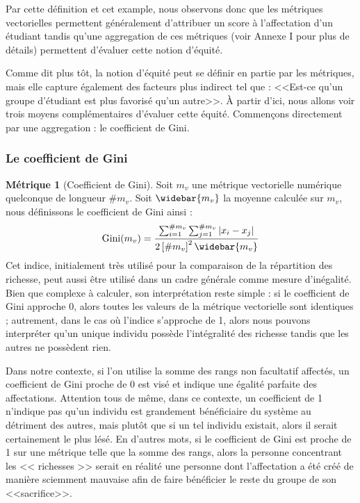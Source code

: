 \documentclass{rapport}
\theoremstyle{definition}
\theoremstyle{remark}
\theoremstyle{plain}
\theoremstyle{definition}
\newtheorem*{metric}{Métrique}
\theoremstyle{remark}
\begin{document}
Par cette définition et cet example, nous observons donc que les métriques vectorielles permettent généralement d'attribuer un score à l'affectation d'un étudiant tandis qu'une aggregation de ces métriques (voir Annexe I pour plus de détails) permettent d'évaluer cette notion d'équité.

Comme dit plus tôt, la notion d'équité peut se définir en partie par les métriques, mais elle capture également des facteurs plus indirect tel que : <<Est-ce qu'un groupe d'étudiant est plus favorisé qu'un autre>>. À partir d'ici, nous allons voir trois moyens complémentaires d'évaluer cette équité.
Commençons directement par une aggregation : le coefficient de Gini.

\subsubsection{Le coefficient de Gini}
\begin{metric}[Coefficient de Gini]
    Soit $m_v$ une métrique vectorielle numérique quelconque de longueur $\#m_v$. Soit $\widebar{m_v}$ la moyenne calculée sur $m_v$, nous définissons le coefficient de Gini ainsi :
    $$
        \text{Gini}(m_v) = \frac{\sum_{i=1}^{\#m_v}\sum_{j=1}^{\#m_v}\left|x_i-x_j\right|}{2\left[\#m_v\right]^2\widebar{m_v}}
    $$
    Cet indice, initialement très utilisé pour la comparaison de la répartition des richesse, peut aussi être utilisé dans un cadre générale comme mesure d'inégalité.
    Bien que complexe à calculer, son interprétation reste simple : si le coefficient de Gini approche 0, alors toutes les valeurs de la métrique vectorielle sont identiques ; autrement, dans le cas où l'indice s'approche de 1, alors nous pouvons interpréter qu'un unique individu possède l'intégralité des richesse tandis que les autres ne possèdent rien.

    Dans notre contexte, si l'on utilise la somme des rangs non facultatif affectés, un coefficient de Gini proche de 0 est visé et indique une égalité parfaite des affectations.
    Attention tous de même, dans ce contexte, un coefficient de 1 n'indique pas qu'un individu est grandement bénéficiaire du système au détriment des autres, mais plutôt que si un tel individu existait, alors il serait certainement le plus lésé.
    En d'autres mots, si le coefficient de Gini est proche de 1 sur une métrique telle que la somme des rangs, alors la personne concentrant les << richesses >> serait en réalité une personne dont l'affectation a été créé de manière sciemment mauvaise afin de faire bénéficier le reste du groupe de son <<sacrifice>>.
\end{metric}
\end{document}
